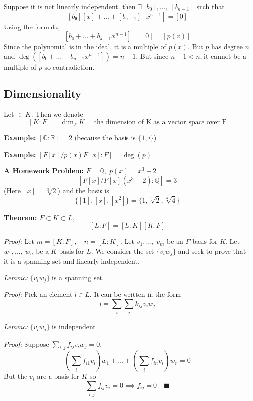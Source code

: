 \documentclass[12pt]{report}
\newcommand{\R}{\mathbb{R}}
\newcommand{\qed}{\quad \blacksquare}
\newcommand{\Q}{\mathbb{Q}}
\newcommand{\C}{\mathbb{C}}
\renewcommand{\indent}{\hspace*{0.5in}}
\begin{document}
        Suppose it is not linearly independent. then $\exists[b_0], \dots,\; [b_{n-1}]$ such that 
        \[[b_0][x] + \dots + [b_{n-1}][x^{n-1}] = [0]\]
        Using the formula, 
        \[[b_0 + \dots + b_{n-1} x^{n-1}] = [0] = [p(x)]\]
        Since the polynomial is in the ideal, it is a multiple of $p(x)$. But $p$ has degree $n$ and $\deg([b_0 + \dots + b_{n-1} x^{n-1}]) = n -1$. But since $n - 1 < n$, it cannot be a multiple of $p$ so contradiction. 

    \subsection*{Dimensionality}
        Let $\subset K$. Then we denote 
        \[[K : F] = \dim_F K = \text{the dimension of K as a vector space over F}\]

        \textbf{Example:} $[\C : \R] = 2$ (because the basis is $\{1, i\}$)

        \textbf{Example:} $[F[x]/ p(x)F[x] : F] = \deg(p)$

        \textbf{A Homework Problem:} $F = \Q, \; p(x) = x^3 -2$ 
            \[[F[x]/F[x](x^3-2) : \Q] = 3\] 
            (Here $[x] = \sqrt[3]{2}$) and the basis is 
            \[\{[1], [x], [x^2]\} = \{1, \sqrt[3]{2}, \sqrt[3]{4}\}\]

        \textbf{Theorem:} $F \subset K \subset L$, 
        \[[L : F] = [L : K][K : F]\]
            
            \emph{Proof:} Let $m = [K : F], \quad n = [L : K]$. Let $v_1, \dots,\; v_m$ be an $F$-basis for $K$. Let $w_1, \dots,\; w_n$ be a $K$-basis for $L$. We consider the set $\{v_i w_j\}$ and seek to prove that it is a spanning set and linearly independent. 

            \indent \emph{Lemma:} $\{v_iw_j\}$ is a spanning set. 

            \indent \emph{Proof:} Pick an element $l \in L$. It can be written in the form 
            \[l = \sum_i \sum_j k_{ij} v_i w_j\]

            \indent \emph{Lemma:} $\{v_iw_j\}$ is independent 

            \indent \emph{Proof:} Suppose $\sum_{i, j} f_{ij} v_i w_j = 0$. 
            \[\left(\sum_{i} f_{i1} v_i\right)w_1 + \dots +\left(\sum_{i} f_{in} v_i\right)w_n = 0\]
            But the $v_i$ are a basis for $K$ so 
            \[\sum_{i,j} f_{ij} v_i = 0 \implies f_{ij} = 0 \qed\]
\end{document}
